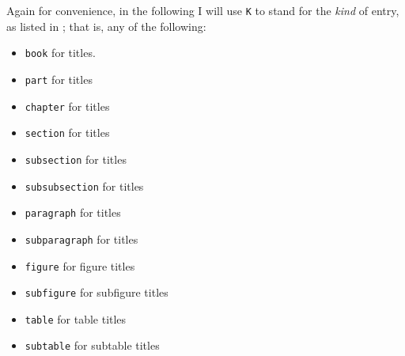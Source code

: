     Again for convenience, in the following I will use \texttt{K} to stand 
for the \emph{kind} of entry, as listed in ; that is, 
any of the following:
 \begin{itemize}
 \item \texttt{book} for \cmd{\book} titles.
 \item \texttt{part} for \cmd{\part} titles
 \item \texttt{chapter} for \cmd{\chapter} titles
 \item \texttt{section} for \cmd{\section} titles
 \item \texttt{subsection} for \cmd{\subsection} titles
 \item \texttt{subsubsection} for \cmd{\subsubsection} titles
 \item \texttt{paragraph} for \cmd{\paragraph} titles
 \item \texttt{subparagraph} for \cmd{\subparagraph} titles
 \item \texttt{figure} for figure \cmd{\caption} titles
 \item \texttt{subfigure} for subfigure \cmd{\caption} titles
 \item \texttt{table} for table \cmd{\caption} titles
 \item \texttt{subtable} for subtable \cmd{\caption} titles
 \end{itemize}

